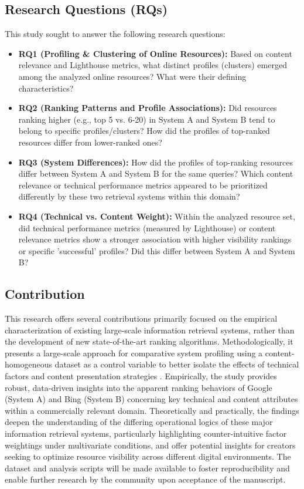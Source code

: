 \documentclass[a4paper,fleqn]{cas-sc}
\begin{document}
\subsection{Research Questions (RQs)}
\label{subsec:rqs}
This study sought to answer the following research questions:
\begin{itemize}
    \item \textbf{RQ1 (Profiling \& Clustering of Online Resources):} Based on content relevance and Lighthouse metrics, what distinct profiles (clusters) emerged among the analyzed online resources? What were their defining characteristics?
    \item \textbf{RQ2 (Ranking Patterns and Profile Associations):} Did resources ranking higher (e.g., top 5 vs. 6-20) in System A and System B tend to belong to specific profiles/clusters? How did the profiles of top-ranked resources differ from lower-ranked ones?
    \item \textbf{RQ3 (System Differences):} How did the profiles of top-ranking resources differ between System A and System B for the same queries? Which content relevance or technical performance metrics appeared to be prioritized differently by these two retrieval systems within this domain?
    \item \textbf{RQ4 (Technical vs. Content Weight):} Within the analyzed resource set, did technical performance metrics (measured by Lighthouse) or content relevance metrics show a stronger association with higher visibility rankings or specific 'successful' profiles? Did this differ between System A and System B?
\end{itemize}

\subsection{Contribution}
\label{subsec:contribution}
This research offers several contributions primarily focused on the empirical characterization of existing large-scale information retrieval systems, rather than the development of new state-of-the-art ranking algorithms. Methodologically, it presents a large-scale approach for comparative system profiling using a content-homogeneous dataset as a control variable to better isolate the effects of technical factors and content presentation strategies \citep{Jayaraman2022, Sezerrakolu2024}. Empirically, the study provides robust, data-driven insights into the apparent ranking behaviors of Google (System A) and Bing (System B) concerning key technical and content attributes within a commercially relevant domain. Theoretically and practically, the findings deepen the understanding of the differing operational logics of these major information retrieval systems, particularly highlighting counter-intuitive factor weightings under multivariate conditions, and offer potential insights for creators seeking to optimize resource visibility across different digital environments. The dataset and analysis scripts will be made available to foster reproducibility and enable further research by the community upon acceptance of the manuscript.
\end{document}
